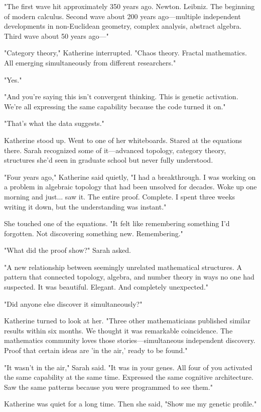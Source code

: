 "The first wave hit approximately 350 years ago. Newton. Leibniz. The beginning of modern calculus. Second wave about 200 years ago—multiple independent developments in non-Euclidean geometry, complex analysis, abstract algebra. Third wave about 50 years ago—"

"Category theory," Katherine interrupted. "Chaos theory. Fractal mathematics. All emerging simultaneously from different researchers."

"Yes."

"And you're saying this isn't convergent thinking. This is genetic activation. We're all expressing the same capability because the code turned it on."

"That's what the data suggests."

Katherine stood up. Went to one of her whiteboards. Stared at the equations there. Sarah recognized some of it—advanced topology, category theory, structures she'd seen in graduate school but never fully understood.

"Four years ago," Katherine said quietly, "I had a breakthrough. I was working on a problem in algebraic topology that had been unsolved for decades. Woke up one morning and just... saw it. The entire proof. Complete. I spent three weeks writing it down, but the understanding was instant."

She touched one of the equations. "It felt like remembering something I'd forgotten. Not discovering something new. Remembering."

"What did the proof show?" Sarah asked.

"A new relationship between seemingly unrelated mathematical structures. A pattern that connected topology, algebra, and number theory in ways no one had suspected. It was beautiful. Elegant. And completely unexpected."

"Did anyone else discover it simultaneously?"

Katherine turned to look at her. "Three other mathematicians published similar results within six months. We thought it was remarkable coincidence. The mathematics community loves those stories—simultaneous independent discovery. Proof that certain ideas are 'in the air,' ready to be found."

"It wasn't in the air," Sarah said. "It was in your genes. All four of you activated the same capability at the same time. Expressed the same cognitive architecture. Saw the same patterns because you were programmed to see them."

Katherine was quiet for a long time. Then she said, "Show me my genetic profile."

